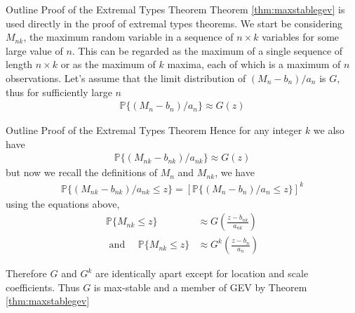 \documentclass[10pt]{beamer}
\begin{document}
\begin{frame}{Outline Proof of the Extremal Types Theorem}
Theorem \ref{thm:maxstablegev} is used directly in the proof of extremal types theorems. We start be considering $M_{nk}$, the maximum random variable in a sequence of $n \times k$ variables for some large value of $n$. This can be regarded as the maximum of a single sequence of length $n \times k$ or as the maximum of $k$ maxima, each of which is a maximum of $n$ observations. Let's assume that the limit distribution of $(M_n-b_n)/a_n$ is $G$, thus for sufficiently large $n$
\begin{align*}
\mathbb{P}\{(M_n-b_n)/a_n\} \approx G(z)
\end{align*}
\end{frame}

\begin{frame}{Outline Proof of the Extremal Types Theorem}
Hence for any integer $k$ we also have 
\begin{align*}
\mathbb{P}\{(M_{nk}-b_{nk})/a_{nk}\} \approx G(z)
\end{align*}
but now we recall the definitions of $M_n$ and $M_{nk}$, we have 
\begin{align*}
\mathbb{P}\{(M_{nk}-b_{nk})/a_{nk}\leq z\}=\left[\mathbb{P}\{(M_{n}-b_{n})/a_{n}\leq z\}\right]^k
\end{align*}
using the equations above,
\begin{align*}
\mathbb{P}\{M_{nk}\leq z\} &\approx G\left(\frac{z-b_{nk}}{a_{nk}}\right)\\
\text{ and }\quad\mathbb{P}\{M_{nk}\leq z\} &\approx G^k\left(\frac{z-b_{n}}{a_{n}}\right)
\end{align*}

Therefore $G$ and $G^k$ are identically apart except for location and scale coefficients. Thus $G$ is max-stable and a member of GEV by Theorem \ref{thm:maxstablegev}
\end{frame}
\end{document}

